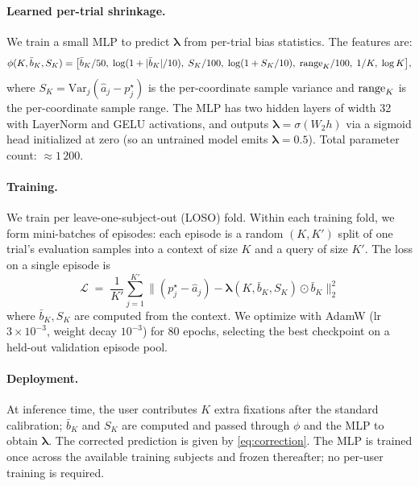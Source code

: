 \paragraph{Learned per-trial shrinkage.}
We train a small MLP to predict $\boldsymbol{\lambda}$ from per-trial bias
statistics. The features are:
\begin{equation}
\phi(K, \bar{b}_K, S_K) = \big[
\bar{b}_K / 50,\;
\log(1 + |\bar{b}_K| / 10),\;
S_K / 100,\;
\log(1 + S_K / 10),\;
{\rm range}_K / 100,\;
1/K,\;
\log K
\big],
\label{eq:features}
\end{equation}
where $S_K = \mathrm{Var}_j(\hat{a}_j - p_j^\star)$ is the per-coordinate
sample variance and ${\rm range}_K$ is the per-coordinate sample range.
The MLP has two hidden layers of width 32 with LayerNorm and GELU
activations, and outputs $\boldsymbol{\lambda} = \sigma(W_2 h)$ via a
sigmoid head initialized at zero (so an untrained model emits
$\boldsymbol{\lambda} = 0.5$). Total parameter count: $\approx 1\,200$.

\paragraph{Training.}
We train per leave-one-subject-out (LOSO) fold. Within each training
fold, we form mini-batches of episodes: each episode is a random
$(K, K')$ split of one trial's evaluation samples into a context of
size $K$ and a query of size $K'$. The loss on a single episode is
\begin{equation}
\mathcal{L} \;=\; \frac{1}{K'} \sum_{j=1}^{K'}
\big\| (p_j^\star - \hat{a}_j) - \boldsymbol{\lambda}(K, \bar{b}_K, S_K) \odot \bar{b}_K \big\|_2^2
\label{eq:loss}
\end{equation}
where $\bar{b}_K, S_K$ are computed from the context. We optimize with
AdamW (lr $3 \times 10^{-3}$, weight decay $10^{-3}$) for $80$ epochs,
selecting the best checkpoint on a held-out validation episode pool.

\paragraph{Deployment.}
At inference time, the user contributes $K$ extra fixations after the
standard calibration; $\bar{b}_K$ and $S_K$ are computed and passed
through $\phi$ and the MLP to obtain $\boldsymbol{\lambda}$. The
corrected prediction is given by \eqref{eq:correction}. The MLP is
trained once across the available training subjects and frozen
thereafter; no per-user training is required.

